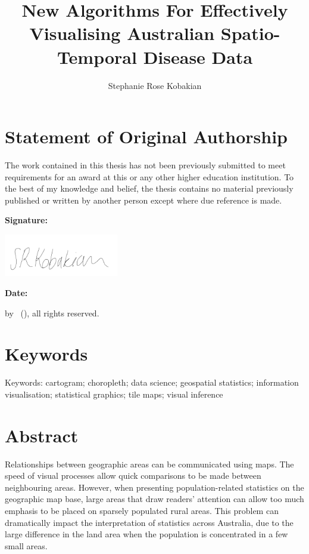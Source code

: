 \documentclass{monashthesis}
\author{Stephanie Rose Kobakian}
\title{New Algorithms For Effectively Visualising Australian Spatio-Temporal Disease Data}
\begin{document}

\titlepage

{\sf\tighttoc\doublespacing}

\hypertarget{statement-of-original-authorship}{%
\chapter*{Statement of Original Authorship}\label{statement-of-original-authorship}}

The work contained in this thesis has not been previously submitted to meet requirements for an award at this or any other higher education institution. To the best of my knowledge and belief, the thesis contains no material previously published or written by another person except where due reference is made.

\textbf{Signature:}

\includegraphics[width=5cm]{figures/srksig}

\textbf{Date:}

\textcopyright { } by \authorname~(\number\the\year), all rights reserved.

\newpage

\hypertarget{keywords}{%
\chapter*{Keywords}\label{keywords}}

Keywords:
cartogram; choropleth; data science; geospatial statistics; information visualisation; statistical graphics; tile maps; visual inference

\hypertarget{abstract}{%
\chapter*{Abstract}\label{abstract}}

Relationships between geographic areas can be communicated using maps. The speed of visual processes allow quick comparisons to be made between neighbouring areas. However, when presenting population-related statistics on the geographic map base, large areas that draw readers' attention can allow too much emphasis to be placed on sparsely populated rural areas.
This problem can dramatically impact the interpretation of statistics across Australia, due to the large difference in the land area when the population is concentrated in a few small areas.
\end{document}
